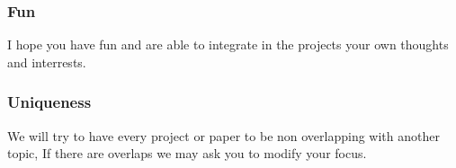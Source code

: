 \subsubsection{Fun}

I hope you have fun and are able to integrate in the projects your own
thoughts and interrests.

\subsubsection{Uniqueness}

We will try to have every project or paper to be non overlapping with
another topic, If there are overlaps we may ask you to modify your
focus.


